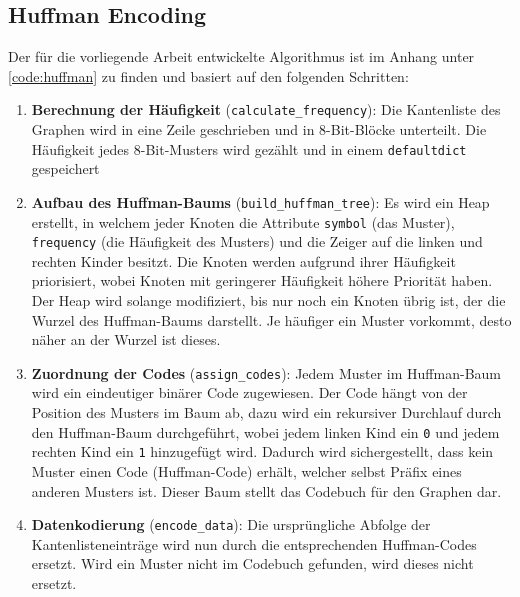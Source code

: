 \documentclass{ffhsthesis}
\begin{document}
\subsection{Huffman Encoding}
\label{ch:huffman}
Der für die vorliegende Arbeit entwickelte Algorithmus ist im Anhang unter \ref{code:huffman} zu finden und basiert auf den folgenden Schritten:
\begin{enumerate}
    \item \textbf{Berechnung der Häufigkeit} (\texttt{calculate\_frequency}): Die Kantenliste des Graphen wird in eine Zeile geschrieben und in 8-Bit-Blöcke unterteilt. Die Häufigkeit jedes 8-Bit-Musters wird gezählt und in einem \texttt{defaultdict} gespeichert
    \item \textbf{Aufbau des Huffman-Baums} (\texttt{build\_huffman\_tree}): Es wird ein Heap erstellt, in welchem jeder Knoten die Attribute \texttt{symbol} (das Muster), \texttt{frequency} (die Häufigkeit des Musters) und die Zeiger auf die linken und rechten Kinder besitzt. Die Knoten werden aufgrund ihrer Häufigkeit priorisiert, wobei Knoten mit geringerer Häufigkeit höhere Priorität haben. Der Heap wird solange modifiziert, bis nur noch ein Knoten übrig ist, der die Wurzel des Huffman-Baums darstellt. Je häufiger ein Muster vorkommt, desto näher an der Wurzel ist dieses.
    \item \textbf{Zuordnung der Codes} (\texttt{assign\_codes}): Jedem Muster im Huffman-Baum wird ein eindeutiger binärer Code zugewiesen. Der Code hängt von der Position des Musters im Baum ab, dazu wird ein rekursiver Durchlauf durch den Huffman-Baum durchgeführt, wobei jedem linken Kind ein \texttt{0} und jedem rechten Kind ein \texttt{1} hinzugefügt wird. Dadurch wird sichergestellt, dass kein Muster einen Code (Huffman-Code) erhält, welcher selbst Präfix eines anderen Musters ist. Dieser Baum stellt das Codebuch für den Graphen dar.
    \item \textbf{Datenkodierung} (\texttt{encode\_data}): Die ursprüngliche Abfolge der Kantenlisteneinträge wird nun durch die entsprechenden Huffman-Codes ersetzt. Wird ein Muster nicht im Codebuch gefunden, wird dieses nicht ersetzt. 
\end{enumerate}
\end{document}
